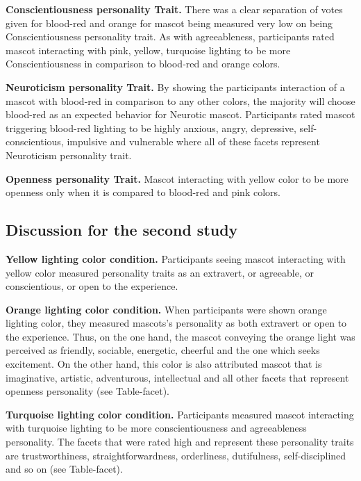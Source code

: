 \par\textbf{Conscientiousness personality Trait.}
There was a clear separation of votes given for blood-red and orange for mascot being measured very low
on being Conscientiousness personality trait.
As with agreeableness, participants rated mascot interacting with pink, yellow, turquoise lighting to be more
Conscientiousness in comparison to blood-red and orange colors.

\par\textbf{Neuroticism personality Trait.}
By showing the participants interaction of a mascot with blood-red in comparison to any other colors,
the majority will choose blood-red as an expected behavior for Neurotic mascot.
Participants rated mascot triggering blood-red lighting to be highly anxious, angry, depressive, self-conscientious,
impulsive and vulnerable where all of these facets represent Neuroticism personality trait.

\par\textbf{Openness personality Trait.}
Mascot interacting with yellow color to be more openness only when it is compared to blood-red and pink colors.

\subsection{Discussion for the second study}
\label{subsec:discussion-for-the-second-study}

\par\textbf{Yellow lighting color condition.}
Participants seeing mascot interacting with yellow color measured personality traits as an extravert, or agreeable,
or conscientious, or open to the experience.

\par\textbf{Orange lighting color condition.}
When participants were shown orange lighting color, they measured mascots's personality as both
extravert or open to the experience.
Thus, on the one hand, the mascot conveying the orange light was perceived as friendly, sociable,
energetic, cheerful and the one which seeks excitement.
On the other hand, this color is also attributed mascot that is imaginative, artistic, adventurous,
intellectual and all other facets that represent openness personality (see Table-facet).

\par\textbf{Turquoise lighting color condition.}
Participants measured mascot interacting with turquoise lighting to be more conscientiousness and
agreeableness personality.
The facets that were rated high and represent these personality traits are trustworthiness, straightforwardness,
orderliness, dutifulness, self-disciplined and so on (see Table-facet).

